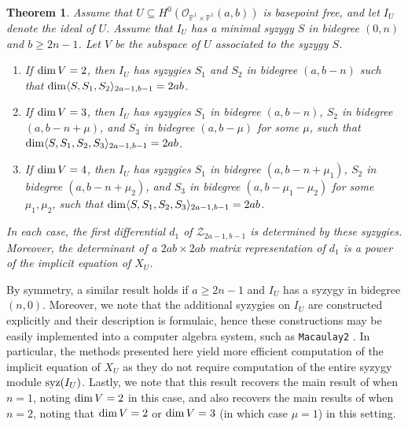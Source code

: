 \documentclass[reqno]{amsart}
\newtheorem*{thm-nonum}{Theorem}
\numberwithin{equation}{section}
\theoremstyle{definition}
\def\O{\mathcal{O}}
\def\P{\mathbb{P}}
\def\Z{\mathcal{Z}}
\def\dim{\mathop{\rm dim}}
\def\syz{\mathop{\rm syz}}
\begin{document}
\begin{thm-nonum}
Assume that $U\subseteq H^0(\O_{\P^1\times \P^1}(a,b))$ is basepoint free, and let $I_U$ denote the ideal of $U$. Assume that $I_U$ has a minimal syzygy $S$ in bidegree $(0,n)$ and $b\geq 2n-1$. Let $V$ be the subspace of $U$ associated to the syzygy $S$.
\begin{enumerate}
    \item[(i)] If $\dim V=2$, then $I_U$ has syzygies $S_1$ and $S_2$ in bidegree $(a,b-n)$ such that $\dim \langle S,S_1,S_2\rangle_{2a-1,b-1}=2ab$.
    \vspace{1mm}

    \item[(ii)] If $\dim V=3$, then $I_U$ has syzygies $S_1$ in bidegree $(a,b-n)$, $S_2$ in bidegree $(a,b-n+\mu)$, and $S_3$ in bidegree $(a,b-\mu)$ for some $\mu$, such that $\dim \langle S,S_1,S_2,S_3\rangle_{2a-1,b-1}=2ab$.
 \vspace{1mm}
 
    \item[(iii)] If $\dim V=4$, then $I_U$ has syzygies $S_1$ in bidegree $(a,b-n+\mu_1)$, $S_2$ in bidegree $(a,b-n+\mu_2)$, and $S_3$ in bidegree $(a,b-\mu_1-\mu_2)$ for some $\mu_1, \mu_2$, such that $\dim \langle S,S_1,S_2,S_3\rangle_{2a-1,b-1}=2ab$.
\end{enumerate}
In each case, the first differential $d_1$ of $\Z_{2a-1,b-1}$ is determined by these syzygies. Moreover, the determinant of a $2ab\times 2ab$ matrix representation of $d_1$ is a power of the implicit equation of $X_U$.
\end{thm-nonum}

By symmetry, a similar result holds if $a\geq 2n-1$ and $I_U$ has a syzygy in bidegree $(n,0)$. Moreover, we note that the additional syzygies on $I_U$ are constructed explicitly and their description is formulaic, hence these constructions may be easily implemented into a computer algebra system, such as \texttt{Macaulay2} \cite{Macaulay2}. In particular, the methods presented here yield more efficient computation of the implicit equation of $X_U$ as they do not require computation of the entire syzygy module $\syz(I_U)$. Lastly, we note that this result recovers the main result of \cite{DS16} when $n=1$, noting $\dim V=2$ in this case, and also recovers the main results of \cite{Weaver25} when $n=2$, noting that $\dim V=2$ or $\dim V=3$ (in which case $\mu =1$) in this setting.
\end{document}
